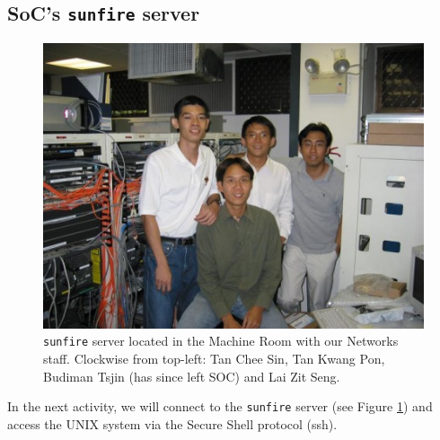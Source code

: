 \subsection{SoC's \texttt{sunfire} server}
\begin{frame}
\begin{figure}
\begin{center}
\includegraphics[scale=0.5]{machine_room}
\caption{\texttt{sunfire} server located in the Machine Room with our Networks
staff. Clockwise from top-left: Tan Chee Sin, Tan Kwang Pon, Budiman Tsjin
(has since left SOC) and Lai Zit Seng.}
\label{fig:sunfire}
\end{center}
\end{figure}
\end{frame}

In the next activity, we will connect to the \texttt{sunfire} server (see Figure
\ref{fig:sunfire}) and access the UNIX system via the Secure Shell protocol
(ssh).

